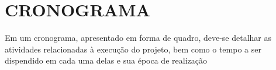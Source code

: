 \chapter{CRONOGRAMA}\label{chp:CRONOGRAMA}
Em um cronograma, apresentado em forma de quadro, deve-se detalhar as atividades relacionadas à execução do projeto, bem como o tempo a ser dispendido em cada uma delas e sua época de realização
